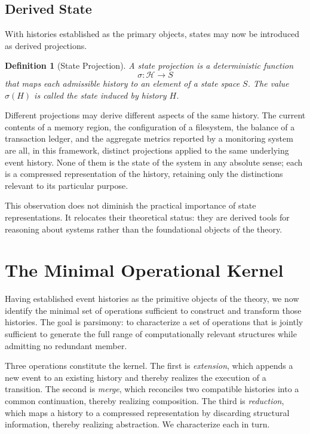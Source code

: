 \documentclass[12pt]{article}
\newtheorem{definition}{Definition}
\begin{document}
\subsection{Derived State}

With histories established as the primary objects, states may now be introduced as derived projections.

\begin{definition}[State Projection]
A \emph{state projection} is a deterministic function
\[
\sigma : \mathcal{H} \rightarrow S
\]
that maps each admissible history to an element of a \emph{state space} $S$. The value $\sigma(H)$ is called the \emph{state induced} by history $H$.
\end{definition}

Different projections may derive different aspects of the same history. The current contents of a memory region, the configuration of a filesystem, the balance of a transaction ledger, and the aggregate metrics reported by a monitoring system are all, in this framework, distinct projections applied to the same underlying event history. None of them is the state of the system in any absolute sense; each is a compressed representation of the history, retaining only the distinctions relevant to its particular purpose.

This observation does not diminish the practical importance of state representations. It relocates their theoretical status: they are derived tools for reasoning about systems rather than the foundational objects of the theory.


\section{The Minimal Operational Kernel}
\label{sec:kernel}

Having established event histories as the primitive objects of the theory, we now identify the minimal set of operations sufficient to construct and transform those histories. The goal is parsimony: to characterize a set of operations that is jointly sufficient to generate the full range of computationally relevant structures while admitting no redundant member.

Three operations constitute the kernel. The first is \emph{extension}, which appends a new event to an existing history and thereby realizes the execution of a transition. The second is \emph{merge}, which reconciles two compatible histories into a common continuation, thereby realizing composition. The third is \emph{reduction}, which maps a history to a compressed representation by discarding structural information, thereby realizing abstraction. We characterize each in turn.
\end{document}
